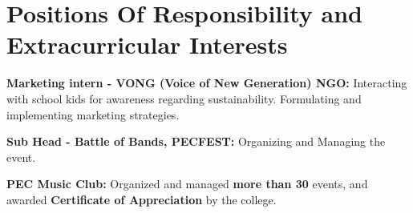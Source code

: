 \documentclass[letterpaper,10pt]{article}
\newenvironment{resume_list}{
  \vspace{-7pt}
  \begin{itemize}[itemsep=-2px, parsep=1pt, leftmargin=30pt]
}{
  \end{itemize}
}
\begin{document}

  \section{Positions Of Responsibility and Extracurricular Interests}

  \begin{resume_list}
    \item \textbf{Marketing intern - VONG (Voice of New Generation) NGO:} Interacting with school kids for awareness regarding sustainability. Formulating and implementing marketing strategies.
    \item \textbf{Sub Head - Battle of Bands, PECFEST:} Organizing and Managing the event.
    \item \textbf{PEC Music Club:} Organized and managed \textbf{more than 30} events, and awarded \textbf{Certificate of Appreciation} by the college.

  \end{resume_list}
\end{document}
